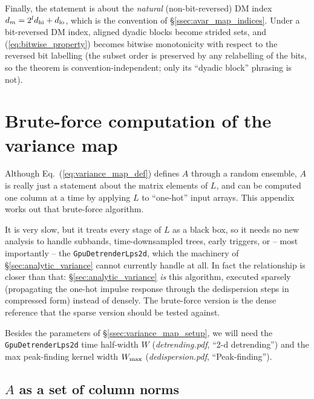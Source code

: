 \documentclass{article}
\numberwithin{equation}{section}   %
\newcommand{\ddnotes}[1]{{\em dedispersion.pdf}, ``#1''}
\newcommand{\dtnotes}[1]{{\em detrending.pdf}, ``#1''}
\begin{document}
Finally, the statement is about the {\em natural} (non-bit-reversed) DM index
$d_m = 2^l d_{\rm hi} + d_{\rm lo}$, which is the convention of
\S\ref{ssec:avar_map_indices}. Under a bit-reversed DM index, aligned dyadic blocks become strided
sets, and (\ref{eq:bitwise_property}) becomes bitwise monotonicity with respect to the
reversed bit labelling (the subset order is preserved by any relabelling of the bits, so the
theorem is convention-independent; only its ``dyadic block'' phrasing is not).

\clearpage

\section{Brute-force computation of the variance map}
\label{sec:variance_map_bruteforce}

Although Eq.\ (\ref{eq:variance_map_def}) defines $A$ through a random ensemble, $A$ is really just
a statement about the matrix elements of $L$, and can be computed one column at a time by applying
$L$ to ``one-hot'' input arrays. This appendix works out that brute-force algorithm.

It is very slow, but it treats every stage of $L$ as a black box, so it needs no new analysis to
handle subbands, time-downsampled trees, early triggers, or -- most importantly -- the
{\tt GpuDetrenderLps2d}, which the machinery of \S\ref{sec:analytic_variance} cannot currently handle at
all. In fact the relationship is closer than that: \S\ref{sec:analytic_variance} {\em is} this
algorithm, executed sparsely (propagating the one-hot impulse response through the dedispersion
steps in compressed form) instead of densely. The brute-force version is the dense reference that
the sparse version should be tested against.

Besides the parameters of \S\ref{ssec:variance_map_setup}, we will need the {\tt GpuDetrenderLps2d} time
half-width $W$ (\dtnotes{2-d detrending}) and the max peak-finding kernel width $W_{\rm max}$
(\ddnotes{Peak-finding}).

\subsection{$A$ as a set of column norms}
\end{document}
